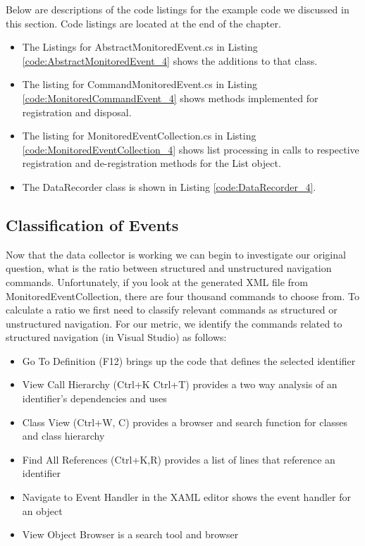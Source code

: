 Below are descriptions of the code listings for the example code we discussed in this section.  Code listings are located at the end of the chapter.
\begin{itemize}
\item
The Listings for AbstractMonitoredEvent.cs in Listing \ref{code:AbstractMonitoredEvent_4}  shows the additions to that class.  
\item
The listing for CommandMonitoredEvent.cs in Listing \ref{code:MonitoredCommandEvent_4} shows methods implemented for registration and disposal.
\item
The listing for MonitoredEventCollection.cs in Listing \ref{code:MonitoredEventCollection_4} shows list processing in calls to respective registration and de-registration methods for the List object.
\item
The DataRecorder class is shown in Listing \ref{code:DataRecorder_4}.
\end{itemize}



\subsection{Classification of Events}
Now that the data collector is working we can begin to investigate our original question, what is the ratio between structured and unstructured navigation commands.  Unfortunately, if you look at the generated XML file from MonitoredEventCollection, there are four thousand commands to choose from. To calculate a ratio we first need to classify relevant commands as structured or unstructured navigation. 
For our metric,  we identify the  commands related to structured navigation (in Visual Studio) as follows:
\begin{itemize}
\item Go To Definition (F12) brings up the code that defines the selected identifier
\item View Call Hierarchy (Ctrl+K Ctrl+T) provides a two way analysis of an identifier's dependencies and uses
\item Class View (Ctrl+W, C) provides a browser and search function for classes and class hierarchy
\item Find All References (Ctrl+K,R) provides a list of lines that reference an identifier
\item Navigate to Event Handler in the XAML editor shows the event handler for an object
\item View Object Browser is a search tool and browser
\end{itemize}

